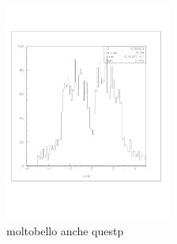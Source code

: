 \documentclass[a4paper]{article}
\begin{document}
\begin{figure}[!htb]
  \includegraphics[width=0.49\textwidth]{ex_images/2_cut_contrast_10.jpg}
  \caption{moltobello anche questp}
  \label{fig:2_all}
\end{figure}
\end{document}
